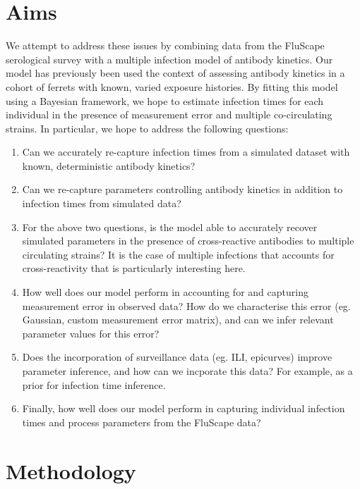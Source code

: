 \documentclass[a4paper,11pt,twoside]{article}
\begin{document}
\section{Aims}
We attempt to address these issues by combining data from the FluScape serological survey with a multiple infection model of antibody kinetics. Our model has previously been used the context of assessing antibody kinetics in a cohort of ferrets with known, varied exposure histories. By fitting this model using a Bayesian framework, we hope to estimate infection times for each individual in the presence of measurement error and multiple co-circulating strains. In particular, we hope to address the following questions:
\begin{enumerate}
\item Can we accurately re-capture infection times from a simulated dataset with known, deterministic antibody kinetics?
\item Can we re-capture parameters controlling antibody kinetics in addition to infection times from simulated data?
\item For the above two questions, is the model able to accurately recover simulated parameters in the presence of cross-reactive antibodies to multiple circulating strains? It is the case of multiple infections that accounts for cross-reactivity that is particularly interesting here.
\item How well does our model perform in accounting for and capturing measurement error in observed data? How do we characterise this error (eg. Gaussian, custom measurement error matrix), and can we infer relevant parameter values for this error?
\item Does the incorporation of surveillance data (eg. ILI, epicurves) improve parameter inference, and how can we incporate this data? For example, as a prior for infection time inference.
\item Finally, how well does our model perform in capturing individual infection times and process parameters from the FluScape data?
\end{enumerate}

\section{Methodology}
\end{document}
